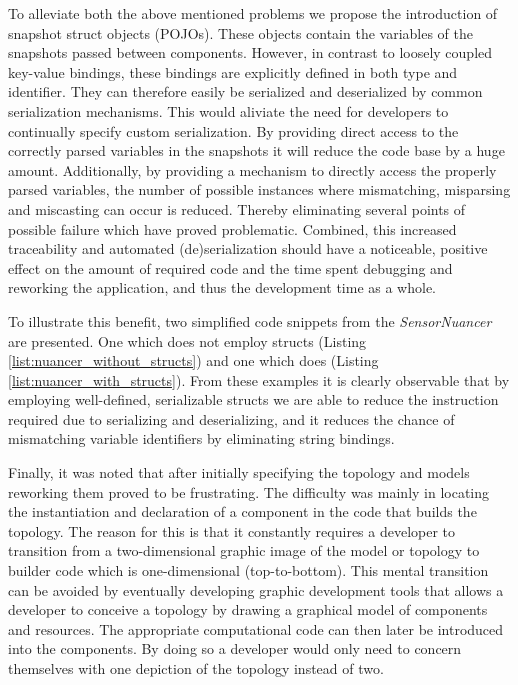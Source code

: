 To alleviate both the above mentioned problems we propose the introduction of snapshot struct objects (POJOs). These objects contain the variables of the snapshots passed between components. However, in contrast to loosely coupled key-value bindings, these bindings are explicitly defined in both type and identifier. They can therefore easily be serialized and deserialized by common serialization mechanisms. This would aliviate the need for developers to continually specify custom serialization. By providing direct access to the correctly parsed variables in the snapshots it will reduce the code base by a huge amount. Additionally, by providing a mechanism to directly access the properly parsed variables, the number of possible instances where mismatching, misparsing and miscasting can occur is reduced. Thereby eliminating several points of possible failure which have proved problematic. Combined, this increased traceability and automated (de)serialization should have a noticeable, positive effect on the amount of required code and the time spent debugging and reworking the application, and thus the development time as a whole.

To illustrate this benefit, two simplified code snippets from the \emph{SensorNuancer} are presented. One which does not employ structs (Listing \ref{list:nuancer_without_structs}) and one which does (Listing \ref{list:nuancer_with_structs}). From these examples it is clearly observable that by employing well-defined, serializable structs we are able to reduce the instruction required due to serializing and deserializing, and it reduces the chance of mismatching variable identifiers by eliminating string bindings.



Finally, it was noted that after initially specifying the topology and models reworking them proved to be frustrating. The difficulty was mainly in locating the instantiation and declaration of a component in the code that builds the topology. The reason for this is that it constantly requires a developer to transition from a two-dimensional graphic image of the model or topology to builder code which is one-dimensional (top-to-bottom). This mental transition can be avoided by eventually developing  graphic development tools that allows a developer to conceive a topology by drawing a graphical model of components and resources. The appropriate computational code can then later be introduced into the components. By doing so a developer would only need to concern themselves with one depiction of the topology instead of two.

